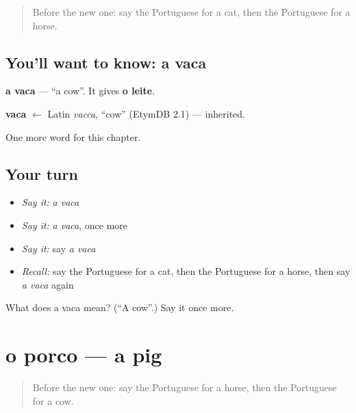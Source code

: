 \label{lesson:PT-C60-vaca}



\begin{quote}
Before the new one: say the Portuguese for a cat, then the Portuguese for a horse.
\end{quote}

\subsection*{You'll want to know: a vaca}
\textbf{a vaca} — \textquotedblleft{}a cow\textquotedblright{}. It gives \textbf{o leite}.

\begin{cousinweb}
\textbf{vaca} $\leftarrow$ Latin \emph{vacca}, \textquotedblleft{}cow\textquotedblright{} (EtymDB 2.1) — inherited.
\end{cousinweb}

\begin{grammarlens}[title={What you've built}]
One more word for this chapter.
\end{grammarlens}

\subsection*{Your turn}
\begin{itemize}
\raggedright
  \item \emph{Say it:} \emph{a vaca}
  \item \emph{Say it:} \emph{a vaca}, once more
  \item \emph{Say it:} say \emph{a vaca}
  \item \emph{Recall:} say the Portuguese for a cat, then the Portuguese for a horse, then say \emph{a vaca} again
\end{itemize}

\begin{tcolorbox}[breakable,colback=teal!4,colframe=teal!35!black,title={Before you move on}]
What does a vaca mean? (\textquotedblleft{}A cow\textquotedblright{}.) Say it once more.
\end{tcolorbox}
\section[o porco]{o porco — a pig}

\label{lesson:PT-C60-porco}



\begin{quote}
Before the new one: say the Portuguese for a horse, then the Portuguese for a cow.
\end{quote}


